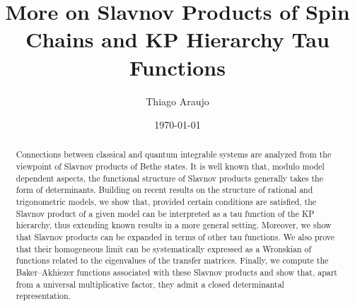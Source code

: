 \documentclass[a4paper,12pt]{amsart}
\begin{document}

\title[Slavnov products, KP and BA functions]{More on Slavnov Products of Spin Chains and KP Hierarchy Tau Functions}

\author{Thiago Araujo}

\address{
Universidade Federal Fluminense, 
Instituto de Ciências Exatas, Departamento de Física
Volta Redonda, RJ, Brazil
}


\begin{abstract}
 Connections between classical and quantum integrable systems are
 analyzed from the viewpoint of Slavnov products of Bethe states. It
 is well known that, modulo model dependent aspects, the functional
 structure of Slavnov products generally takes the form of
 determinants. Building on recent results on the structure of rational
 and trigonometric models, we show that, provided certain conditions
 are satisfied, the Slavnov product of a given model can be
 interpreted as a tau function of the KP hierarchy, thus extending
 known results in a more general setting. Moreover, we show that
 Slavnov products can be expanded in terms of other tau functions. We
 also prove that their homogeneous limit can be systematically
 expressed as a Wronskian of functions related to the eigenvalues of
 the transfer matrices.  Finally, we compute the Baker–Akhiezer
 functions associated with these Slavnov products and show that, apart
 from a universal multiplicative factor, they admit a closed
 determinantal representation.
\end{abstract}

\date{\today}

\maketitle
\end{document}
